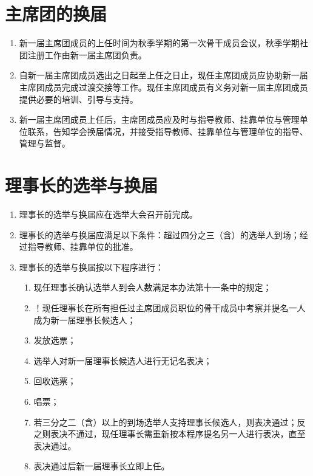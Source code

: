 \section{主席团的换届}

\begin{enumerate}[resume]
    \item 新一届主席团成员的上任时间为秋季学期的第一次骨干成员会议，秋季学期社团注册工作由新一届主席团负责。
    
    \item 自新一届主席团成员选出之日起至上任之日止，现任主席团成员应协助新一届主席团成员完成过渡交接等工作。现任主席团成员有义务对新一届主席团成员提供必要的培训、引导与支持。
    
    \item 新一届主席团成员上任后，主席团成员应及时与指导教师、挂靠单位与管理单位联系，告知学会换届情况，并接受指导教师、挂靠单位与管理单位的指导、管理与监督。
\end{enumerate}

\section{理事长的选举与换届}

\begin{enumerate}[resume]
    \item 理事长的选举与换届应在选举大会召开前完成。
    
    \item 理事长的选举与换届应满足以下条件：超过四分之三（含）的选举人到场；经过指导教师、挂靠单位的批准。
    
    \item 理事长的选举与换届按以下程序进行：
    
    \begin{enumerate}
        \item 现任理事长确认选举人到会人数满足本办法第十一条中的规定；
        \item ！现任理事长在所有担任过主席团成员职位的骨干成员中考察并提名一人成为新一届理事长候选人；
        \item 发放选票；
        \item 选举人对新一届理事长候选人进行无记名表决；
        \item 回收选票；
        \item 唱票；
        \item 若三分之二（含）以上的到场选举人支持理事长候选人，则表决通过；反之则表决不通过，现任理事长需重新按本程序提名另一人进行表决，直至表决通过。
        \item 表决通过后新一届理事长立即上任。
    \end{enumerate}
    
\end{enumerate}

